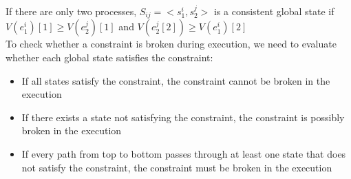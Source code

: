\begin{multicols*}{2}
\noindent If there are only two processes, $S_{ij} = <s_1^{i}, s_2^{j}>$ is a consistent global state if $V(e_1^{i})[1] \ge V(e_2^{j})[1]$ and $V(e_2^{j}[2]) \ge V(e_1^{i})[2]$\\

\noindent To check whether a constraint is broken during execution, we need to evaluate whether each global state satisfies the constraint:
\begin{itemize}
  \item If all states satisfy the constraint, the constraint cannot be broken in the execution
  \item If there exists a state not satisfying the constraint, the constraint is possibly broken in the execution
  \item If every path from top to bottom passes through at least one state that does not satisfy the constraint, the constraint must be broken in the execution
\end{itemize}

\end{multicols*}
